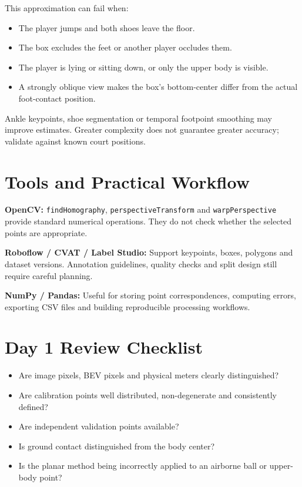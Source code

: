 \documentclass[11pt,a4paper,oneside]{report}
\begin{document}
This approximation can fail when:

\begin{itemize}
  \item The player jumps and both shoes leave the floor.
  \item The box excludes the feet or another player occludes them.
  \item The player is lying or sitting down, or only the upper body is visible.
  \item A strongly oblique view makes the box's bottom-center differ from the actual foot-contact position.
\end{itemize}

Ankle keypoints, shoe segmentation or temporal footpoint smoothing may improve estimates. Greater complexity does not guarantee greater accuracy; validate against known court positions.


\section{Tools and Practical Workflow}


\begin{toolBox}
\textbf{OpenCV:}\quad
\texttt{findHomography}, \texttt{perspectiveTransform} and \texttt{warpPerspective} provide standard numerical operations. They do not check whether the selected points are appropriate.

\textbf{Roboflow / CVAT / Label Studio:}\quad
Support keypoints, boxes, polygons and dataset versions. Annotation guidelines, quality checks and split design still require careful planning.

\textbf{NumPy / Pandas:}\quad
Useful for storing point correspondences, computing errors, exporting CSV files and building reproducible processing workflows.
\end{toolBox}

\section{Day 1 Review Checklist}

\begin{takeawayBox}
\begin{itemize}
  \item Are image pixels, BEV pixels and physical meters clearly distinguished?
  \item Are calibration points well distributed, non-degenerate and consistently defined?
  \item Are independent validation points available?
  \item Is ground contact distinguished from the body center?
  \item Is the planar method being incorrectly applied to an airborne ball or upper-body point?
\end{itemize}
\end{takeawayBox}
\end{document}
